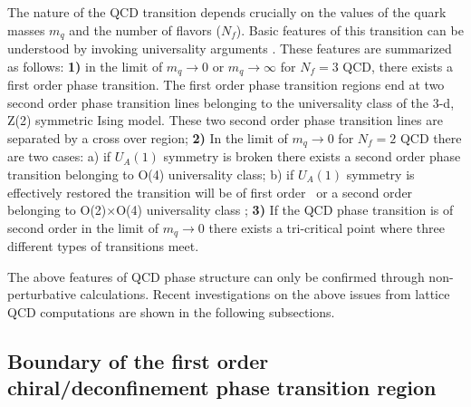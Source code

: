 \documentclass{PoS}
\begin{document}
The nature of the QCD transition depends crucially on the values of the quark masses $m_q$ and
the number of flavors ($N_f$).  Basic features of this transition can be
understood by invoking universality arguments \cite{Pisarski:1983ms}. 
These features are summarized as follows:
 {\bf 1)} in the limit of $m_q\rightarrow 0$ or $m_q\rightarrow \infty$ for $N_f=3$ QCD, there exists a first order phase transition. The first order phase transition regions
end at two second order phase transition lines belonging to the universality class of the 3-d, Z(2) symmetric  
Ising model.  These two second order phase transition lines  are separated by a cross over region; 
{\bf 2)} In the limit of $m_q\rightarrow0$ for $N_f=2$ QCD there are two cases: a)  if $U_A(1)$ symmetry is broken there exists a second order phase transition belonging to O(4) universality class; b) if $U_A(1)$ symmetry is effectively restored
the transition will be of first order~\cite{Pisarski:1983ms} or a second order belonging to O(2)$\times$O(4) universality class\cite{Pelissetto:2013hqa,Grahl:2013pba} ;
{\bf 3)} If the QCD phase transition is of second order in the limit of $m_q\rightarrow0$  there exists a tri-critical point where three different types of transitions meet.


The above features of QCD phase structure can only be confirmed through non-perturbative calculations.
Recent investigations on the above issues from lattice QCD computations are shown in the following subsections.





\subsection{Boundary of the first order chiral/deconfinement phase transition region}
\label{sec:boundary}
\end{document}
